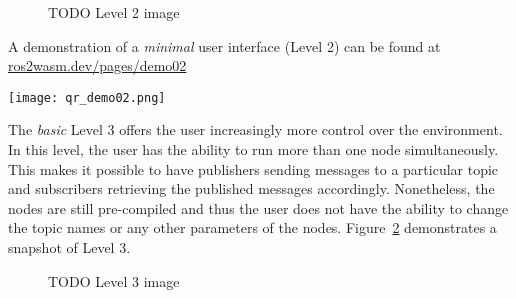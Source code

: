         \begin{figure}[htbp]
            \centering
            \caption{TODO Level 2 image}\label{fig:ui2}
        \end{figure}

        \begin{tcolorbox}[title=Example 2]
            \begin{minipage}[t]{0.87\linewidth}
                \vspace*{0.5\baselineskip}
                A demonstration of a \textit{minimal} user interface (Level 2) can
                be found at \href{https://ros2wasm.dev/pages/demo02/index.html}{\textsf{ros2wasm.dev/pages/demo02}}
            \end{minipage}\hfill%
            \begin{minipage}[t]{0.1\linewidth}
                \vspace*{0pt}
                \texttt{[image: qr\_demo02.png]}
            \end{minipage}
        \end{tcolorbox}



        The \textit{basic} Level 3 offers the user increasingly more control over
        the environment. In this level, the user has the ability to run more than
        one node simultaneously. This makes it possible to have publishers sending
        messages to a particular topic and subscribers retrieving the published
        messages accordingly. Nonetheless, the nodes are still pre-compiled and 
        thus the user does not have the ability to change the topic names or any
        other parameters of the nodes. Figure~\ref{fig:ui3} demonstrates a snapshot 
        of Level 3.

        \begin{figure}[htbp]
            \centering
            \caption{TODO Level 3 image}\label{fig:ui3}
        \end{figure}

